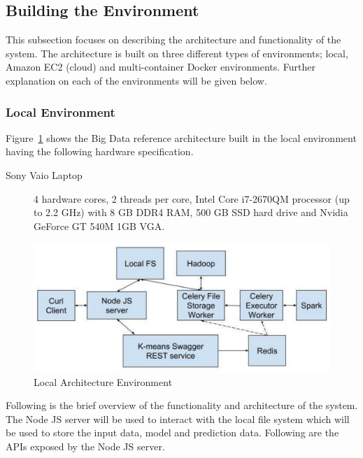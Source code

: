 \subsection{Building the Environment}

This subsection focuses on describing the architecture and functionality of 
the system. The architecture is built on three different types of 
environments; local, Amazon EC2 (cloud) and multi-container Docker 
environments. Further explanation on each of the environments will be given 
below.

\subsubsection{Local Environment}
\label{subsubsec:localenv}

Figure~\ref{fig:localarchitecture} shows the Big Data reference architecture 
built in the local environment having the following hardware specification.

\begin{description}
	\item[Sony Vaio Laptop] 4 hardware cores, 2 threads per core, Intel Core 
	i7-2670QM processor (up to 2.2 GHz) with 8 GB DDR4 RAM, 500 GB SSD hard 
	drive and Nvidia GeForce GT 540M 1GB VGA.
\end{description}

\begin{figure}[htbp] 
	\centering
	\includegraphics[width=\columnwidth]{images/localarchitecture.pdf}
	\caption{Local Architecture Environment}
\label{fig:localarchitecture} 
\end{figure}

Following is the brief overview of the functionality and architecture 
of the system. The Node JS server will be used to interact with the local file 
system which will be used to store the input data, model and prediction data. 
Following are the APIs exposed by the Node JS server.


